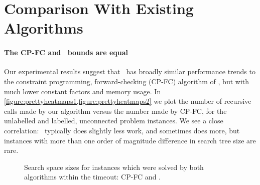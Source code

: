 \section{Comparison With Existing Algorithms}
\label{sec:comparison}

\paragraph{The CP-FC and \McSplit\ bounds are equal}
Our experimental results suggest that \McSplit\ has broadly similar performance
trends to the constraint programming, forward-checking (CP-FC) algorithm of
\citet{DBLP:conf/cp/NdiayeS11}, but with much lower constant factors and memory usage.
In \cref{figure:prettyheatmaps1,figure:prettyheatmaps2} we plot the number of
recursive calls made by our algorithm versus the number made by
CP-FC, for the unlabelled and labelled, unconnected problem
instances.  We see a close
correlation: \McSplit\ typically does slightly less work, and sometimes does more, but
instances with more than one order of magnitude difference in search tree size
are rare.

\begin{figure}[htb]
    \centering
    \caption{Search space sizes for instances which were solved by both algorithms within the timeout: CP-FC and \McSplit.}
    \label{figure:prettyheatmaps}
\end{figure}

